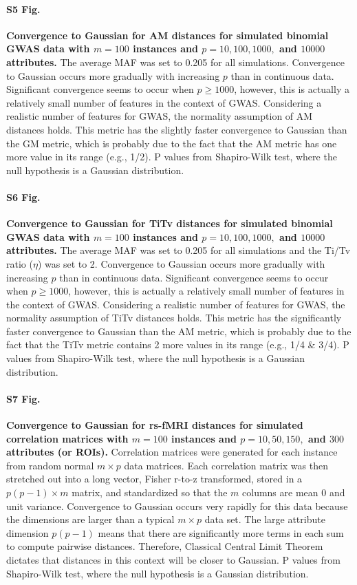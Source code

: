 \documentclass[10pt,letterpaper]{article}
\begin{document}
\paragraph*{S5 Fig.}
\label{S5_Fig}
{\bf Convergence to Gaussian for AM distances for simulated binomial GWAS data with $m=100$ instances and $p=10, 100, 1000,$ and $10000$ attributes.} The average MAF was set to 0.205 for all simulations. Convergence to Gaussian occurs more gradually with increasing $p$ than in continuous data. Significant convergence seems to occur when $p \geq 1000$, however, this is actually a relatively small number of features in the context of GWAS. Considering a realistic number of features for GWAS, the normality assumption of AM distances holds. This metric has the slightly faster convergence to Gaussian than the GM metric, which is probably due to the fact that the AM metric has one more value in its range (e.g., 1/2). P values from Shapiro-Wilk test, where the null hypothesis is a Gaussian distribution.

\paragraph*{S6 Fig.}
\label{S6_Fig}
{\bf Convergence to Gaussian for TiTv distances for simulated binomial GWAS data with $m=100$ instances and $p=10, 100, 1000,$ and $10000$ attributes.} The average MAF was set to 0.205 for all simulations and the Ti/Tv ratio ($\eta$) was set to 2. Convergence to Gaussian occurs more gradually with increasing $p$ than in continuous data. Significant convergence seems to occur when $p \geq 1000$, however, this is actually a relatively small number of features in the context of GWAS. Considering a realistic number of features for GWAS, the normality assumption of TiTv distances holds. This metric has the significantly faster convergence to Gaussian than the AM metric, which is probably due to the fact that the TiTv metric contains 2 more values in its range (e.g., 1/4 \& 3/4). P values from Shapiro-Wilk test, where the null hypothesis is a Gaussian distribution.

\paragraph*{S7 Fig.}
\label{S7_Fig}
{\bf Convergence to Gaussian for rs-fMRI distances for simulated correlation matrices with $m=100$ instances and $p=10, 50, 150,$ and $300$ attributes (or ROIs).} Correlation matrices were generated for each instance from random normal $m \times p$ data matrices. Each correlation matrix was then stretched out into a long vector, Fisher r-to-z transformed, stored in a $p(p-1) \times m$ matrix, and standardized so that the $m$ columns are mean 0 and unit variance. Convergence to Gaussian occurs very rapidly for this data because the dimensions are larger than a typical $m \times p$ data set. The large attribute dimension $p(p-1)$ means that there are significantly more terms in each sum to compute pairwise distances. Therefore, Classical Central Limit Theorem dictates that distances in this context will be closer to Gaussian. P values from Shapiro-Wilk test, where the null hypothesis is a Gaussian distribution.
\end{document}
